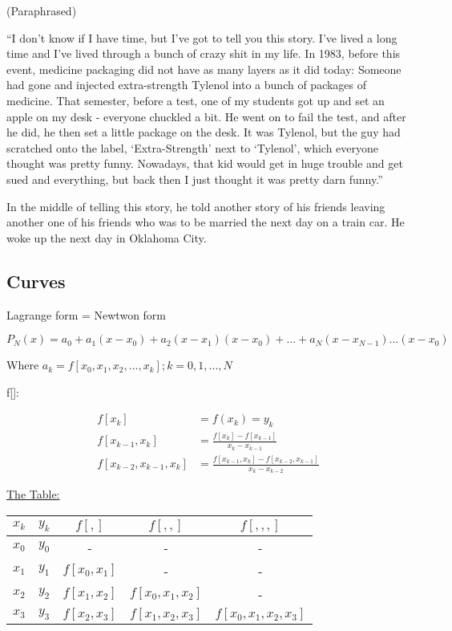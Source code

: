 (Paraphrased)

``I don't know if I have time, but I've got to tell you this story. I've lived a long time and I've lived through a bunch of crazy shit in my life. In 1983, before this event, medicine packaging did not have as many layers as it did today: Someone had gone and injected extra-strength Tylenol into a bunch of packages of medicine. That semester, before a test, one of my students got up and set an apple on my desk - everyone chuckled a bit. He went on to fail the test, and after he did, he then set a little package on the desk. It was Tylenol, but the guy had scratched onto the label, `Extra-Strength' next to `Tylenol', which everyone thought was pretty funny. Nowadays, that kid would get in huge trouble and get sued and everything, but back then I just thought it was pretty darn funny.''

In the middle of telling this story, he told another story of his friends leaving another one of his friends who was to be married the next day on a train car. He woke up the next day in Oklahoma City.

\subsection{Curves}

Lagrange form = Newtwon form

\begin{equation}
  P_N(x) = a_0 + a_1 (x - x_0) + a_2 (x - x_1) (x - x_0) + ... + a_N (x - x_{N-1}) ... (x - x_0)
\end{equation}

Where $a_k = f[x_0, x_1, x_2, ..., x_k]; k = 0, 1, ..., N$

f[]:

\begin{align*}
  f[x_k]                   &= f(x_k) = y_k \\
  f[x_{k-1}, x_k]          &= \frac{f[x_k] - f[x_{k-1}]}{x_k - x_{k-1}} \\
  f[x_{k-2}, x_{k-1}, x_k] &= \frac{f[x_{k-1}, x_k] - f[x_{k-2}, x_{k-1}]}{x_k - x_{k-2}}
\end{align*}

\underline{The Table:}

\begin{tabular}{ |c|c|c|c|c| }
$x_k$ & $y_k$ & $f[,]$        & $f[,,]$            & $f[,,,]$\\
\hline
$x_0$ & $y_0$ & -             & -                  & - \\
$x_1$ & $y_1$ & $f[x_0, x_1]$ & -                  & - \\
$x_2$ & $y_2$ & $f[x_1, x_2]$ & $f[x_0, x_1, x_2]$ & - \\
$x_3$ & $y_3$ & $f[x_2, x_3]$ & $f[x_1, x_2, x_3]$ & $f[x_0, x_1, x_2, x_3]$
\end{tabular}